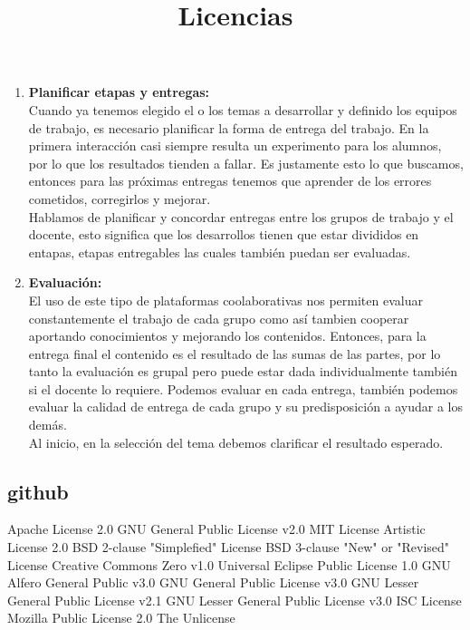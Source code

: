 \begin{enumerate}
 \item \textbf{Planificar etapas y entregas:}\\
 Cuando ya tenemos elegido el o los temas a desarrollar y definido los equipos de trabajo, es necesario planificar la forma de entrega del trabajo. En la primera
 interacci\'on casi siempre resulta un experimento para los alumnos, por lo que los resultados tienden a fallar. Es justamente esto lo que buscamos, entonces 
 para las pr\'oximas entregas tenemos que aprender de los errores cometidos, corregirlos y mejorar.\\
 Hablamos de planificar y concordar entregas entre los grupos de trabajo y el docente, esto significa que los desarrollos tienen que estar divididos en entapas, 
 etapas entregables las cuales tambi\'en puedan ser evaluadas.
 
 \item \textbf{Evaluaci\'on:}\\
 El uso de este tipo de plataformas coolaborativas nos permiten evaluar constantemente el trabajo de cada grupo como as\'i tambien cooperar aportando conocimientos
 y mejorando los contenidos. Entonces, para la entrega final el contenido es el resultado de las sumas de las partes, por lo tanto la evaluaci\'on es grupal
 pero puede estar dada individualmente tambi\'en si el docente lo requiere. Podemos evaluar en cada entrega, tambi\'en podemos evaluar la calidad de entrega de 
 cada grupo y su predisposici\'on a ayudar a los dem\'as.\\
 Al inicio, en la selecci\'on del tema debemos clarificar el resultado esperado.
 \end{enumerate}

\subsection{github}
\title{Licencias}
Apache License 2.0 
GNU General Public License v2.0
MIT License
Artistic License 2.0
BSD 2-clause "Simplefied" License
BSD 3-clause "New" or "Revised" License
Creative Commons Zero v1.0 Universal
Eclipse Public License 1.0
GNU Alfero General Public v3.0
GNU General Public License v3.0
GNU Lesser General Public License v2.1
GNU Lesser General Public License v3.0
ISC License
Mozilla Public License 2.0
The Unlicense
 
